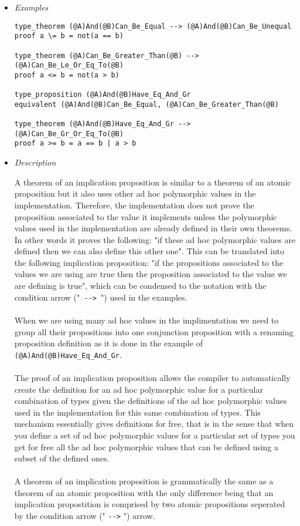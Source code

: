 \documentclass{article}
\begin{document}
\begin{itemize}
\item \textit{Examples}

\begin{verbatim}
type_theorem (@A)And(@B)Can_Be_Equal --> (@A)And(@B)Can_Be_Unequal
proof a \= b = not(a == b)

type_theorem (@A)Can_Be_Greater_Than(@B) --> (@A)Can_Be_Le_Or_Eq_To(@B)
proof a <= b = not(a > b)

type_proposition (@A)And(@B)Have_Eq_And_Gr
equivalent (@A)And(@B)Can_Be_Equal, (@A)Can_Be_Greater_Than(@B)

type_theorem (@A)And(@B)Have_Eq_And_Gr --> (@A)Can_Be_Gr_Or_Eq_To(@B)
proof a >= b = a == b | a > b
\end{verbatim}

\item \textit{Description}

A theorem of an implication proposition is similar to a theorem of an atomic
proposition but it also uses other ad hoc polymorphic values in the
implementation. Therefore, the implementation does not prove the proposition
associated to the value it implements unless the polymorphic values used in the
implementation are already defined in their own theorems. In other words it
proves the following: "if these ad hoc polymorphic values are defined then we
can also define this other one". This can be translated into the following
implication proposition: "if the propositions associated to the values we are
using are true then the proposition associated to the value we are defining is
true", which can be condensed to the notation with the condition arrow
("\verb| --> |") used in the examples.
\\\\
When we are using many ad hoc values in the implimentation we need to
group all their propositions into one conjunction proposition with
a renaming proposition definition as it is done in the example of \\
\verb|(@A)And(@B)Have_Eq_And_Gr|.
\\\\
The proof of an implication proposition allows the compiler to
automatically create the definition for an ad hoc polymorphic value for a
particular combination of types given the definitions of the ad hoc polymorphic
values used in the implementation for this same combination of types. This
mechanism essentially gives definitions for free, that is in the sense that
when you define a set of ad hoc polymorphic values for a particular set of
types you get for free all the ad hoc polymorphic values that can be defined
using a subset of the defined ones.
\\\\
A theorem of an implication proposition is grammatically the same as
a theorem of an atomic proposition with the only difference being that an
implication propostition is comprised by two atomic propositions seperated by
the condition arrow (" \verb|-->| ") arrow.

\end{itemize}
\end{document}

